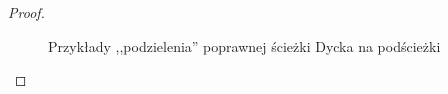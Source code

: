 \begin{proof}
\begin{figure}[H]
		\caption{Przykłady ,,podzielenia'' poprawnej ścieżki Dycka na podścieżki}
	\end{figure}

\end{proof}